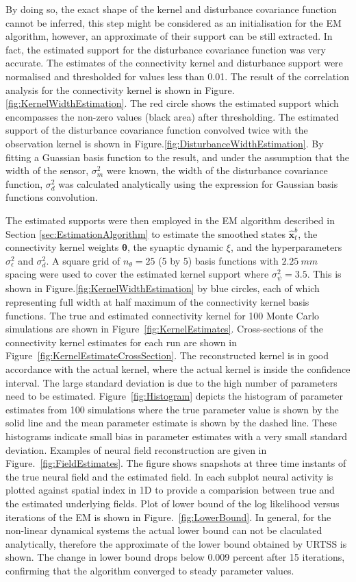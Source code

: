 \documentclass[]{article}
\begin{document}
 By doing so, the exact shape of the kernel and disturbance covariance function cannot be inferred, this step might be considered as an initialisation for the EM algorithm, however, an approximate of their support can be still extracted. In fact, the estimated support for the disturbance covariance function was very accurate. The estimates of the connectivity kernel and disturbance support were normalised and thresholded for values less than 0.01. The result of the correlation analysis for the connectivity kernel is shown in Figure.\ref{fig:KernelWidthEstimation}. The red circle shows the estimated support which encompasses the non-zero values (black area) after thresholding. The estimated support of the disturbance covariance function convolved twice with the observation kernel is shown in Figure.\ref{fig:DisturbanceWidthEstimation}. By fitting a Guassian basis function to the result, and under the assumption that the width of the sensor, $\sigma_m^2$ were known, the width of the disturbance covariance function, $\sigma_d^2$ was calculated analytically using the expression for Gaussian basis functions convolution.

The estimated supports were then employed in the EM algorithm described in Section \ref{sec:EstimationAlgorithm} to estimate the smoothed states $\hat{\mathbf x}_t^b$, the connectivity kernel weights $\boldsymbol\theta$, the synaptic dynamic $\xi$, and the hyperparameters $\sigma_{\epsilon}^2$ and $\sigma^2_d$. A  square grid of $n_{\theta}=25$ (5 by 5) basis functions with $2.25~mm$ spacing were used to cover the estimated kernel support where $\sigma_{\psi}^2=3.5$. This is shown in Figure.\ref{fig:KernelWidthEstimation} by blue circles, each of which representing full width at half maximum of the connectivity kernel basis functions. The true and estimated connectivity kernel for 100 Monte Carlo simulations are shown in Figure~\ref{fig:KernelEstimates}. Cross-sections of the connectivity kernel estimates for each run are shown in Figure~\ref{fig:KernelEstimateCrossSection}. The reconstructed kernel is in good accordance with the actual kernel, where the actual kernel is inside the confidence interval. The large standard deviation is due to the high number of parameters need to be estimated. Figure~\ref{fig:Histogram} depicts the histogram of parameter estimates from 100 simulations where the true parameter value is shown by the solid line and the mean parameter estimate is shown by the dashed line. These histograms indicate small bias in parameter estimates with a very small standard deviation. Examples of neural field reconstruction are given in Figure.~\ref{fig:FieldEstimates}.  The figure shows snapshots at three time instants of the true neural field and the estimated field. In each subplot neural activity is plotted against spatial index in 1D to provide a comparision between true and the estimated underlying fields. Plot of lower bound of the log likelihood versus iterations of the EM is shown in Figure.~\ref{fig:LowerBound}. In general, for the non-linear dynamical systems the actual lower bound can not be claculated analytically, therefore the approximate of the lower bound obtained by URTSS is shown. The change in lower bound drops below 0.009 percent after 15 iterations, confirming
that the algorithm converged to steady parameter values.
\end{document}
